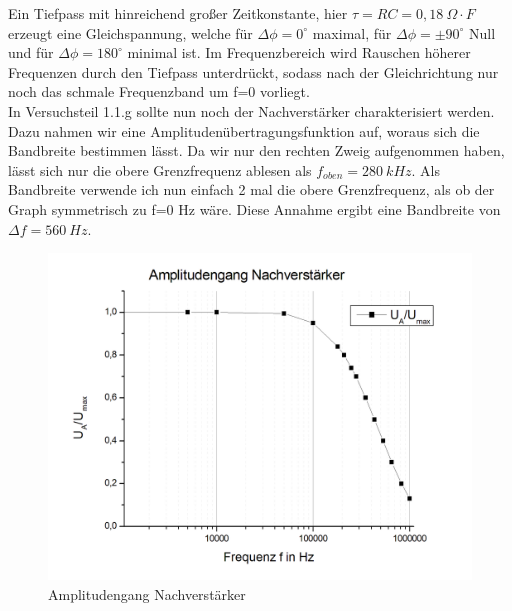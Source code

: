 \documentclass{scrartcl}						%
\begin{document}
			 \newline
			 Ein Tiefpass mit hinreichend großer Zeitkonstante, hier $ \tau =RC=0,18 \ \Omega \cdot F $ erzeugt eine Gleichspannung, welche für $ \Delta \phi =0^\circ $ maximal, für $ \Delta \phi = \pm 90^\circ $ Null und für $ \Delta \phi =180^\circ $ minimal ist. Im Frequenzbereich wird Rauschen höherer Frequenzen durch den Tiefpass unterdrückt, sodass nach der Gleichrichtung nur noch das schmale Frequenzband um f=0 vorliegt.
			 \newline \\
			 In Versuchsteil 1.1.g sollte nun noch der Nachverstärker charakterisiert werden. Dazu nahmen wir eine Amplitudenübertragungsfunktion auf, woraus sich die Bandbreite bestimmen lässt. Da wir nur den rechten Zweig aufgenommen haben, lässt sich nur die obere Grenzfrequenz ablesen als $ f_{oben}=280\ kHz $. Als Bandbreite verwende ich nun einfach 2 mal die obere Grenzfrequenz, als ob der Graph symmetrisch zu f=0 Hz wäre. Diese Annahme ergibt eine Bandbreite von $ \Delta f =560\ Hz $.
			 \begin{figure}[h!]
				 \centering
				 \includegraphics[scale=0.3]{A1g}
				 \caption{Amplitudengang Nachverstärker}
			 \end{figure}
			 
\end{document}
